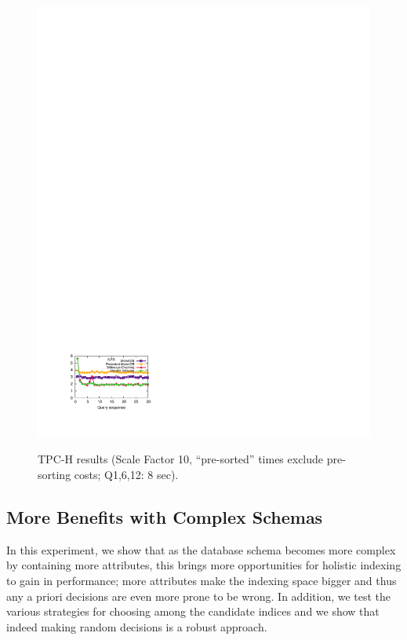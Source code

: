 \begin{figure}[t]
\begin{center}
{           \includegraphics[trim=1.5cm 2cm 14cm 22.5cm]{Figures/holistic/tpch_q12}
        }%
\vspace{-0.25 in}
    \caption{TPC-H results (Scale Factor 10, ``pre-sorted'' times exclude pre-sorting costs; Q1,6,12: 8 sec).}
\vspace{-0.7 cm}
   \label{fig:tpch}
    \end{center}
\end{figure}

\subsection{More Benefits with Complex Schemas}
\label{subsec:strategies}

In this experiment, we show that as the database schema becomes more complex by containing more attributes,
this brings more opportunities for holistic indexing to gain in performance;
more attributes make the indexing space bigger and thus any a priori decisions 
are even more prone to be wrong. In addition, we test the various strategies for choosing 
among the candidate indices and we show that indeed making random decisions is a robust approach. 

